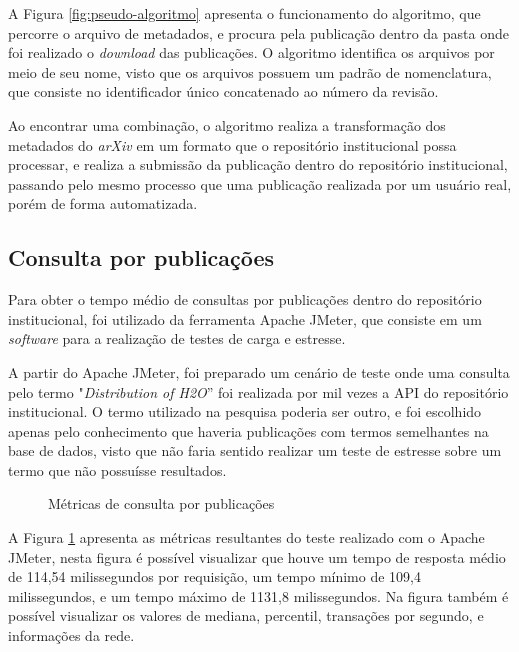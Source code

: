 A Figura \ref{fig:pseudo-algoritmo} apresenta o funcionamento do algoritmo, que percorre o arquivo
de metadados, e procura pela publicação dentro da pasta onde foi realizado o \emph{download} das publicações.
O algoritmo identifica os arquivos por meio de seu nome, visto que os arquivos possuem um padrão de nomenclatura,
que consiste no identificador único concatenado ao número da revisão.

Ao encontrar uma combinação, o algoritmo realiza a transformação dos metadados do
\emph{arXiv} em um formato que o repositório institucional possa processar, e realiza
a submissão da publicação dentro do repositório institucional, passando pelo mesmo
processo que uma publicação realizada por um usuário real, porém de forma automatizada.

\subsection{Consulta por publicações}

Para obter o tempo médio de consultas por publicações dentro do repositório
institucional, foi utilizado da ferramenta Apache JMeter, que consiste em um
\emph{software} para a realização de testes de carga e estresse.

A partir do Apache JMeter, foi preparado um cenário de teste onde uma consulta
pelo termo "\emph{Distribution of H2O}'' foi realizada por mil vezes a API do
repositório institucional. O termo utilizado na pesquisa poderia ser outro, e
foi escolhido apenas pelo conhecimento que haveria publicações com termos semelhantes
na base de dados, visto que não faria sentido realizar um teste de estresse sobre um termo
que não possuísse resultados.

\begin{figure}[H]
    \caption{Métricas de consulta por publicações}
    \label{fig:matrics-advanced-search}
\end{figure}

A Figura \ref{fig:matrics-advanced-search} apresenta as métricas resultantes do teste
realizado com o Apache JMeter, nesta figura é possível visualizar que houve um tempo de
resposta médio de 114,54 milissegundos por requisição, um tempo mínimo de 109,4
milissegundos, e um tempo máximo de 1131,8 milissegundos. Na figura também é possível
visualizar os valores de mediana, percentil, transações por segundo, e informações da
rede.


